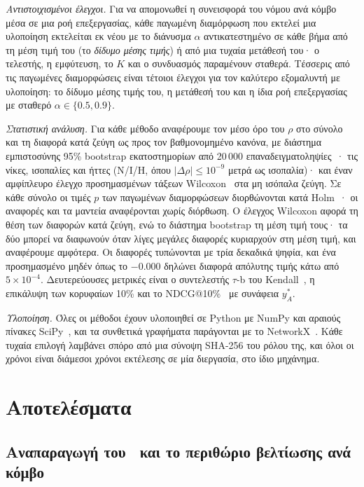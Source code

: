 \documentclass[11pt,a4paper]{article}
\theoremstyle{definition}
\theoremstyle{plain}
\begin{document}
\emph{Αντιστοιχισμένοι έλεγχοι.} Για να απομονωθεί η συνεισφορά του νόμου ανά κόμβο μέσα σε μια ροή επεξεργασίας, κάθε παγωμένη διαμόρφωση που εκτελεί μια υλοποίηση εκτελείται εκ νέου με το διάνυσμα $\alpha$ αντικατεστημένο σε κάθε βήμα από τη μέση τιμή του (το \emph{δίδυμο μέσης τιμής}) ή από μια τυχαία μετάθεσή του· ο τελεστής, η εμφύτευση, το $K$ και ο συνδυασμός παραμένουν σταθερά. Τέσσερις από τις παγωμένες διαμορφώσεις είναι τέτοιοι έλεγχοι για τον καλύτερο εξομαλυντή με υλοποίηση: το δίδυμο μέσης τιμής του, η μετάθεσή του και η ίδια ροή επεξεργασίας με σταθερό $\alpha\in\{0.5,0.9\}$.

\emph{Στατιστική ανάλυση.} Για κάθε μέθοδο αναφέρουμε τον μέσο όρο του $\rho$ στο σύνολο και τη διαφορά κατά ζεύγη ως προς τον βαθμονομημένο κανόνα, με διάστημα εμπιστοσύνης 95\% bootstrap εκατοστημορίων από 20\,000 επαναδειγματοληψίες~\cite{efron93}· τις νίκες, ισοπαλίες και ήττες (Ν/Ι/Η, όπου $|\Delta\rho|\le10^{-9}$ μετρά ως ισοπαλία)· και έναν αμφίπλευρο έλεγχο προσημασμένων τάξεων Wilcoxon~\cite{wilcoxon45} στα μη ισόπαλα ζεύγη. Σε κάθε σύνολο οι τιμές $p$ των \NFrozen{} παγωμένων διαμορφώσεων διορθώνονται κατά Holm~\cite{holm79}· οι αναφορές και τα μαντεία αναφέρονται χωρίς διόρθωση. Ο έλεγχος Wilcoxon αφορά τη θέση των διαφορών κατά ζεύγη, ενώ το διάστημα bootstrap τη μέση τιμή τους· τα δύο μπορεί να διαφωνούν όταν λίγες μεγάλες διαφορές κυριαρχούν στη μέση τιμή, και αναφέρουμε αμφότερα. Οι διαφορές τυπώνονται με τρία δεκαδικά ψηφία, και ένα προσημασμένο μηδέν όπως το $-0.000$ δηλώνει διαφορά απόλυτης τιμής κάτω από $5\times10^{-4}$. Δευτερεύουσες μετρικές είναι ο συντελεστής $\tau$-b του Kendall~\cite{kendall38}, η επικάλυψη των κορυφαίων 10\% και το NDCG@10\%~\cite{jarvelin02} με συνάφεια $y^*_A$.

\emph{Υλοποίηση.} Όλες οι μέθοδοι έχουν υλοποιηθεί σε Python με NumPy και αραιούς πίνακες SciPy~\cite{harris20,virtanen20}, και τα συνθετικά γραφήματα παράγονται με το NetworkX~\cite{hagberg08}. Κάθε τυχαία επιλογή λαμβάνει σπόρο από μια σύνοψη SHA-256 του ρόλου της, και όλοι οι χρόνοι είναι διάμεσοι χρόνοι εκτέλεσης σε μία διεργασία, στο ίδιο μηχάνημα.

\FloatBarrier
\section{Αποτελέσματα}\label{sec:results}

\subsection{\texorpdfstring{Αναπαραγωγή του~\cite{konstantellos26} και το περιθώριο βελτίωσης ανά κόμβο}{Αναπαραγωγή του κανόνα βαθμονόμησης και το περιθώριο βελτίωσης ανά κόμβο}}\label{sec:replication}
\end{document}
